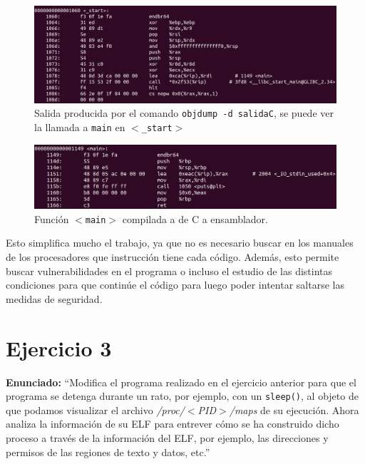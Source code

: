 \documentclass{article}
\begin{document}
\begin{figure}[H]
    \includegraphics[width=\textwidth]{imagenes/Captura desde 2022-11-17 17-53-55.png}
    \caption{Salida producida por el comando \texttt{objdump -d salidaC}, se puede ver la llamada a \texttt{main} en \texttt{$<$\_start$>$}}
\end{figure}


\begin{figure}[H]
    \includegraphics[width=\textwidth]{imagenes/Captura desde 2022-11-17 17-56-56.png}
    \caption{Función \texttt{$<$main$>$} compilada a de C a ensamblador.}
\end{figure}

Esto simplifica mucho el trabajo, ya que no es necesario buscar en los manuales de los procesadores que instrucción tiene cada código. Además, esto permite buscar vulnerabilidades en el programa o incluso el estudio de las distintas condiciones para que continúe el código para luego poder intentar saltarse las medidas de seguridad.

\bigskip

\section{Ejercicio 3}

\textbf{Enunciado: }``Modifica el programa realizado en el ejercicio anterior para que el programa se detenga durante un rato, por ejemplo, con un \texttt{sleep()}, al objeto de que podamos visualizar el archivo \textit{/proc/$<$PID$>$/maps} de su ejecución. Ahora analiza la información de su ELF para entrever cómo se ha construido dicho proceso a través de la información del ELF, por ejemplo, las direcciones y permisos de las regiones de texto y datos, etc.''
\end{document}
